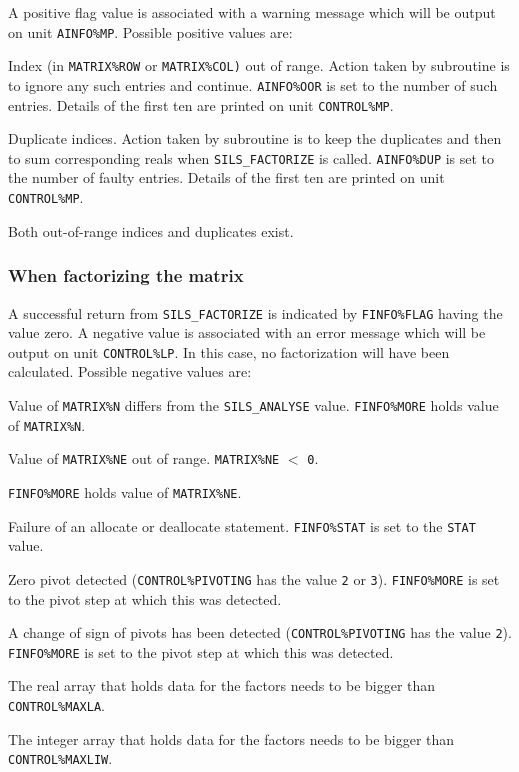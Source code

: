 \documentclass{galahad}
\newcommand{\packagename}{SILS}
\begin{document}
A positive flag value is associated with a warning message
 which will  be output on unit {\tt AINFO\%MP}. Possible positive values are:

\begin{description}

 Index (in {\tt MATRIX\%ROW} or {\tt MATRIX\%COL)} out of range.
 Action taken by
 subroutine is to ignore any such entries and continue. {\tt AINFO\%OOR}
 is set to the number of such entries. Details of the first ten are
 printed on unit {\tt CONTROL\%MP}.

 Duplicate indices.
       Action taken by subroutine is to keep the duplicates and then to
       sum corresponding reals when {\tt \packagename\_FACTORIZE} is called.
       {\tt AINFO\%DUP} is set to the number of
       faulty entries. Details of the first ten are printed on unit
       {\tt CONTROL\%MP}.

 Both out-of-range indices and duplicates exist.

\end{description}

\subsubsection{When factorizing the matrix}\label{errorfact}
A successful return from {\tt \packagename\_FACTORIZE} is indicated by
 {\tt FINFO\%FLAG} having the value zero.  A negative value is
 associated with an error message which will  be output on unit
 {\tt CONTROL\%LP}. In this case, no factorization will have been
 calculated.  Possible negative values are:


\begin{description}
 Value of {\tt MATRIX\%N} differs from the {\tt \packagename\_ANALYSE}
value. {\tt FINFO\%MORE} holds value of {\tt MATRIX\%N}.

 Value of {\tt MATRIX\%NE} out of range.  {\tt MATRIX\%NE} $<$ {\tt 0}.

{\tt FINFO\%MORE} holds value of {\tt MATRIX\%NE}.

 Failure of an allocate or deallocate statement. {\tt FINFO\%STAT}
 is set to the {\tt STAT} value.

 Zero pivot detected ({\tt CONTROL\%PIVOTING} has the value
{\tt 2} or {\tt 3}).
{\tt FINFO\%MORE} is set to the pivot step at which this was detected.

 A change of sign of pivots has been detected  ({\tt CONTROL\%PIVOTING}
has the value {\tt 2}). {\tt FINFO\%MORE}
is set to the pivot step at which this was detected.

 The real array that holds data for the factors
  needs to be bigger than {\tt CONTROL\%MAXLA}.

 The integer array that holds data for the factors
 needs to be bigger than {\tt CONTROL\%MAXLIW}.

\end{description}
\end{document}
